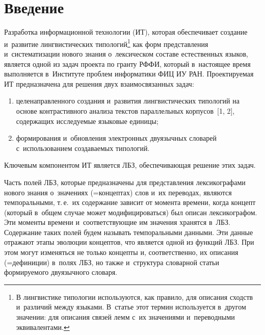 
  
\vspace*{-6pt}



\thispagestyle{headings}

\begin{multicols}{2}

\label{st\stat}

   
   
\section{Введение}

    Разработка информационной технологии (ИТ), которая обеспечивает 
создание и~развитие лингвистических типологий\footnote[4]{В лингвистике 
типологии используются, как правило, для описания сходств и~различий между языками. 
В~статье 
этот термин используется в~другом значении: для описания связей лемм с~их значениями 
и~переводными эквивалентами.} как форм представления и~сис\-те\-ма\-ти\-за\-ции нового 
знания о~лексическом составе естественных языков, является одной из задач 
проекта по гранту РФФИ, который в~настоящее время выполняется 
в~Институте проб\-лем информатики ФИЦ ИУ РАН. Проектируемая 
ИТ предназначена для решения двух 
взаимосвязанных задач: 
\begin{enumerate}[(1)]
\item целенаправленного создания и~развития 
линг\-ви\-сти\-че\-ских типологий на основе кон\-трас\-тив\-но\-го анализа текстов 
параллельных кор\-пу\-сов~[1, 2], содержащих исследуемые языковые единицы; 
\item формирования и~обновления электронных двуязычных словарей 
с~использованием создаваемых типологий.
\end{enumerate}

 Ключевым компонентом ИТ 
является ЛБЗ, обеспечивающая решение 
этих задач.
    
    Часть полей ЛБЗ, которые предназначены для представления 
лексикографами нового знания о~значениях (=\;кон\-цеп\-тах) слов и~их 
переводах, являются темпоральными, т.\,е.\ их содержание зависит от 
момента времени, когда концепт (который в~общем случае может 
модифицироваться) был описан лексикографом. Эти моменты времени 
и~соответствующие им значения хранятся в~ЛБЗ. Содержание таких полей 
будем называть темпоральными данными. Эти данные отражают этапы 
эволюции концептов, что является одной из функций ЛБЗ. При этом могут 
изменяться не только концепты и, соответственно, их описания  
(=\;де\-фи\-ни\-ции) в~полях ЛБЗ, но также и~структура словарной статьи 
формируемого двуязычного словаря.


\end{multicols}
